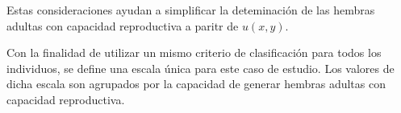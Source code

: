Estas consideraciones ayudan a simplificar la deteminación de las hembras adultas con capacidad
reproductiva a paritr de $u(x,y)$.

Con la finalidad de utilizar un mismo criterio de clasificación para todos los individuos, se
define una escala única para este caso de estudio. Los valores de dicha escala son agrupados por
la capacidad de generar hembras adultas con capacidad reproductiva.
